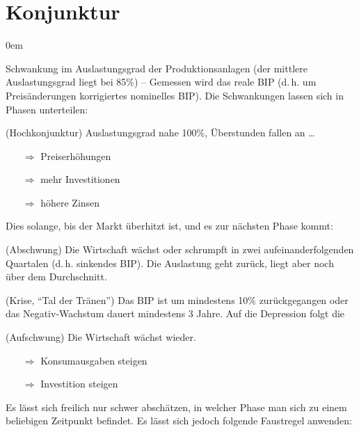 \section{Konjunktur}
\begin{description}\itemsep0em
	\item [Konjunktur] 
	Schwankung im Auslastungsgrad der Produktionsanlagen (der mittlere Auslastungsgrad liegt bei 85\%) -- Gemessen wird das reale BIP (d.\,h. um Preisänderungen korrigiertes nominelles BIP). Die Schwankungen lassen sich in Phasen unterteilen:
	
	\item [Boom] 
	(Hochkonjunktur) Auslastungsgrad nahe 100\%, Überstunden fallen an \dots
	\begin{itemize}\itemsep0em
		\item [$\Rightarrow$] Preiserhöhungen
		\item [$\Rightarrow$] mehr Investitionen
		\item [$\Rightarrow$] höhere Zinsen
	\end{itemize}
	Dies solange, bis der Markt überhitzt ist, und es zur nächsten Phase kommt:

	\item [Rezession]
	(Abschwung) Die Wirtschaft wächst oder schrumpft in zwei aufeinanderfolgenden Quartalen (d.\,h. sinkendes BIP). Die Auslastung geht zurück, liegt aber noch über dem Durchschnitt.

	\item [Depression]
	(Krise, \enquote{Tal der Tränen}) Das BIP ist um mindestens 10\% zurückgegangen oder das Negativ-Wachstum dauert mindestens 3 Jahre. Auf die Depression folgt die

	\item [Expansion]
	(Aufschwung) Die Wirtschaft wächst wieder.
	\begin{itemize}\itemsep0em
		\item [$\Rightarrow$] Konsumausgaben steigen
		\item [$\Rightarrow$] Investition steigen
	\end{itemize}
\end{description}
Es lässt sich freilich nur schwer abschätzen, in welcher Phase man sich zu einem beliebigen Zeitpunkt befindet. Es lässt sich jedoch folgende Faustregel anwenden:

